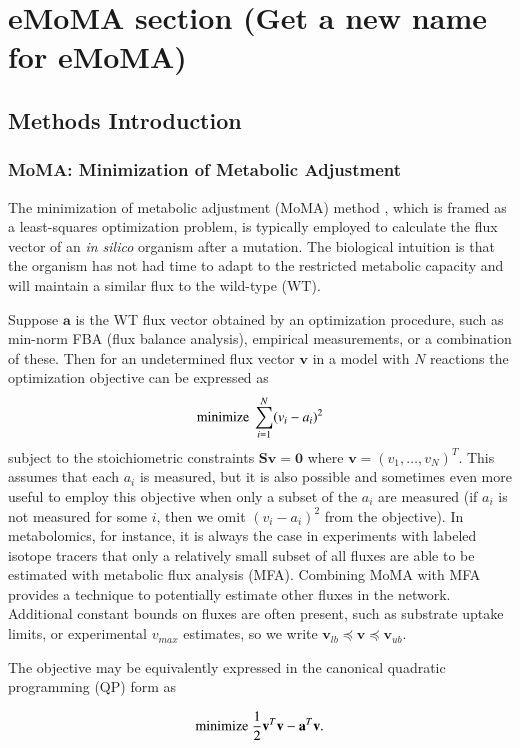 \documentclass[phd,tocprelim]{cornell}
\theoremstyle{break}
\begin{document}
\chapter{eMoMA section (Get a new name for eMoMA)}

\section{Methods Introduction}
\subsection{MoMA: Minimization of Metabolic Adjustment}

The minimization of metabolic adjustment (MoMA) method \cite{Segre2002}, 
which is framed as a least-squares optimization problem, is typically employed
to calculate the flux vector of an \emph{in silico} organism after a
mutation.  The biological intuition is that the organism has not had
time to adapt to the restricted metabolic capacity and will maintain
a similar flux to the wild-type (WT).

Suppose $\mathbf{a}$ is the WT flux vector obtained by an optimization procedure, 
such as min-norm FBA (flux balance analysis), empirical measurements, or a
combination of these. Then for an undetermined flux vector $\mathbf{v}$ in a model 
with $N$ reactions the optimization objective can be expressed as
\[ \textnormal{minimize}\ \sum^N_{i=1}(v_i-a_i)^2 \]
subject to the stoichiometric constraints $\mathbf{S v} = \mathbf{0}$
where $\mathbf{v} = (v_1, \ldots, v_N)^T$. This assumes that each $a_i$ is measured,
but it is also possible and sometimes even more useful to employ this objective when only
a subset of the $a_i$ are measured (if $a_i$ is not measured for some $i$, then we omit
$(v_i-a_i)^2$ from the objective). In metabolomics, for instance, it is always the case in experiments with 
labeled isotope tracers that only a relatively small subset of all fluxes are able to be estimated 
with metabolic flux analysis (MFA). Combining MoMA with MFA provides a technique to 
potentially estimate other fluxes in the network. 
Additional constant bounds on fluxes are often present, such as substrate uptake limits,
or experimental $v_{max}$ estimates, so we write 
$\mathbf{v}_{lb} \preceq \mathbf{v} \preceq \mathbf{v}_{ub}$.  

The objective may be equivalently expressed in the 
canonical quadratic programming (QP) form as

\[ \textnormal{minimize}\ \frac{1}{2}\mathbf{v}^T \mathbf{v} - \mathbf{a}^T \mathbf{v}\textnormal{.}\]
\end{document}
